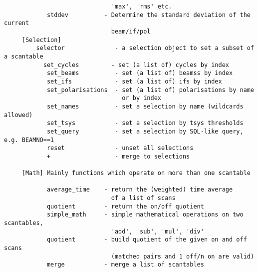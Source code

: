 \documentclass[11pt]{article}
\begin{document}
\begin{verbatim}
                              'max', 'rms' etc.
            stddev          - Determine the standard deviation of the current
                              beam/if/pol
     [Selection]
         selector              - a selection object to set a subset of a scantable
           set_cycles         - set (a list of) cycles by index
            set_beams          - set (a list of) beamss by index
            set_ifs            - set (a list of) ifs by index
            set_polarisations  - set (a list of) polarisations by name
                                 or by index
            set_names          - set a selection by name (wildcards allowed)
            set_tsys           - set a selection by tsys thresholds
            set_query          - set a selection by SQL-like query, e.g. BEAMNO==1
            reset              - unset all selections
            +                  - merge to selections

     [Math] Mainly functions which operate on more than one scantable

            average_time    - return the (weighted) time average
                              of a list of scans
            quotient        - return the on/off quotient
            simple_math     - simple mathematical operations on two scantables,
                              'add', 'sub', 'mul', 'div'
            quotient        - build quotient of the given on and off scans
                              (matched pairs and 1 off/n on are valid)
            merge           - merge a list of scantables


\end{verbatim}
\end{document}
